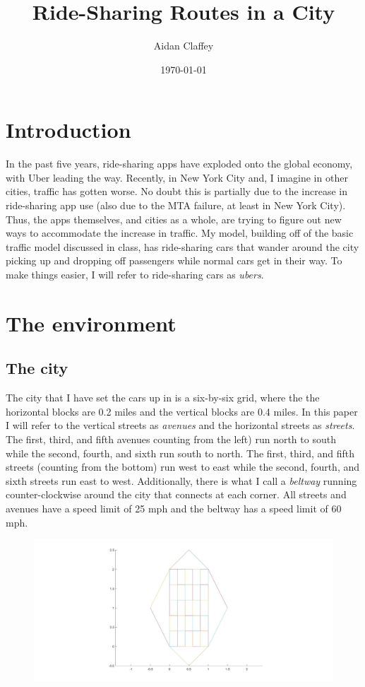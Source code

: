 \documentclass{article}
\begin{document}
\title{Ride-Sharing Routes in a City}
\author{Aidan Claffey}
\date{\today}
\maketitle

\section{Introduction}
In the past five years, ride-sharing apps have exploded onto the global economy, with Uber leading the way. Recently, in New York City and, I imagine in other cities, traffic has gotten worse. No doubt this is partially due to the increase in ride-sharing app use (also due to the MTA failure, at least in New York City). Thus, the apps themselves, and cities as a whole, are trying to figure out new ways to accommodate the increase in traffic. My model, building off of the basic traffic model discussed in class, has ride-sharing cars that wander around the city picking up and dropping off passengers while normal cars get in their way. To make things easier, I will refer to ride-sharing cars as \textit{ubers}.

\section{The environment}
\subsection{The city}
The city that I have set the cars up in is a six-by-six grid, where the the horizontal blocks are 0.2 miles and the vertical blocks are 0.4 miles. In this paper I will refer to the vertical streets as \textit{avenues} and the horizontal streets as \textit{streets}. The first, third, and fifth avenues counting from the left) run north to south while the second, fourth, and sixth run south to north. The first, third, and fifth streets (counting from the bottom) run west to east while the second, fourth, and sixth streets run east to west. Additionally, there is what I call a \textit{beltway} running counter-clockwise around the city that connects at each corner. All streets and avenues have a speed limit of 25 mph and the beltway has a speed limit of 60 mph.

\begin{figure}[h]
\includegraphics[width=16cm]{mapofcity.jpg}
\end{figure}
\end{document}
